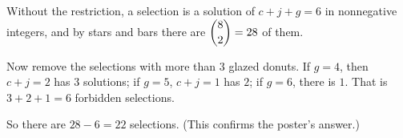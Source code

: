 Without the restriction, a selection is a solution of $c+j+g=6$ in nonnegative integers, and by stars and bars there are $\dbinom{8}{2}=28$ of them.

Now remove the selections with more than $3$ glazed donuts. If $g=4$, then $c+j=2$ has $3$ solutions; if $g=5$, $c+j=1$ has $2$; if $g=6$, there is $1$. That is $3+2+1=6$ forbidden selections.

So there are $28-6=\boxed{22}$ selections. (This confirms the poster's answer.)
